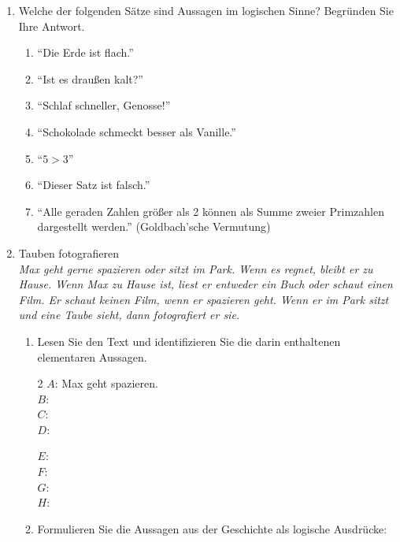\documentclass[ngerman,11pt]{article}
\begin{document}
\begin {enumerate}
\item Welche der folgenden Sätze sind Aussagen im logischen Sinne? Begründen Sie Ihre Antwort.

\begin{enumerate}
    \item ``Die Erde ist flach.''
    \vfill
    \item ``Ist es draußen kalt?''
    \vfill
    \item ``Schlaf schneller, Genosse!''
    \vfill
    \item ``Schokolade schmeckt besser als Vanille.''
    \vfill
    \item ``$5 > 3$''
    \vfill
    \item ``Dieser Satz ist falsch.''
    \vfill
    \item ``Alle geraden Zahlen größer als 2 können als Summe zweier Primzahlen dargestellt werden.'' (Goldbach'sche Vermutung)
\end{enumerate}
\pagebreak
\item Tauben fotografieren\\
\emph{Max geht gerne spazieren oder sitzt im Park. Wenn es regnet, bleibt er zu Hause. Wenn Max zu Hause ist, liest er entweder ein Buch oder schaut einen Film. Er schaut keinen Film, wenn er spazieren geht. Wenn er im Park sitzt und eine Taube sieht, dann fotografiert er sie.}

\begin {enumerate}
\item Lesen Sie den Text und identifizieren Sie die darin enthaltenen elementaren Aussagen.
\begin{multicols}{2}
    $A$: Max geht spazieren. \\[3mm]
    $B$: \underline{\hspace{6cm}} \\[3mm]
    $C$: \underline{\hspace{6cm}} \\[3mm]
    $D$: \underline{\hspace{6cm}} 

    \columnbreak

    $E$: \underline{\hspace{6cm}} \\[3mm]
    $F$: \underline{\hspace{6cm}} \\[3mm]
    $G$: \underline{\hspace{6cm}} \\[3mm]
    $H$: \underline{\hspace{6cm}}
\end{multicols}
\item Formulieren Sie die Aussagen aus der Geschichte als logische Ausdrücke: \\[-1mm]


\end{enumerate}
\end{enumerate}
\end{document}
